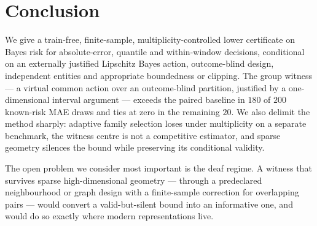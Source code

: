 \documentclass[11pt]{article}
\theoremstyle{definition}
\begin{document}
\section{Conclusion}

We give a train-free, finite-sample, multiplicity-controlled lower certificate on Bayes risk for absolute-error, quantile and within-window decisions, conditional on an externally justified Lipschitz Bayes action, outcome-blind design, independent entities and appropriate boundedness or clipping. The group witness --- a virtual common action over an outcome-blind partition, justified by a one-dimensional interval argument --- exceeds the paired baseline in $180$ of $200$ known-risk MAE draws and ties at zero in the remaining $20$. We also delimit the method sharply: adaptive family selection loses under multiplicity on a separate benchmark, the witness centre is not a competitive estimator, and sparse geometry silences the bound while preserving its conditional validity.

The open problem we consider most important is the deaf regime. A witness that survives sparse high-dimensional geometry --- through a predeclared neighbourhood or graph design with a finite-sample correction for overlapping pairs --- would convert a valid-but-silent bound into an informative one, and would do so exactly where modern representations live.
\end{document}
